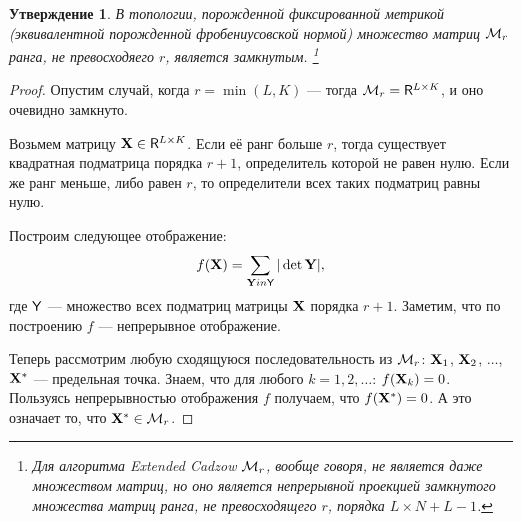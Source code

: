 \documentclass[12pt,a4paper,fleqn,leqno]{article}
\newtheorem{proposition}{Утверждение}%
\begin{document}
\begin{proposition}
В топологии, порожденной фиксированной метрикой (эквивалентной порожденной фробениусовской нормой) множество матриц $\mathcal{M}_r$ ранга, не превосходяего $r$, является замкнутым. \footnote{Для алгоритма Extended Cadzow $\mathcal{M}_r$, вообще говоря, не является даже множеством матриц, но оно является непрерывной проекцией замкнутого множества матриц ранга, не превосходящего $r$, порядка $L \times N + L - 1$.}
\end{proposition}
\begin{proof}
Опустим случай, когда $r = \min(L, K)$ --- тогда $\mathcal{M}_r = \mathsf{R}^{L \times K}$, и оно очевидно замкнуто.

Возьмем матрицу $\mathbf{X} \in \mathsf{R}^{L \times K}$. Если её ранг больше $r$, тогда существует квадратная подматрица порядка $r+1$, определитель которой не равен нулю. Если же ранг меньше, либо равен $r$, то определители всех таких подматриц равны нулю.

Построим следующее отображение: 
\begin{equation*}
f(\mathbf{X}) = \sum \limits_{\mathbf{Y} in \mathsf{Y}} |\det \mathbf{Y}|,
\end{equation*}
где $\mathsf{Y}$ --- множество всех подматриц матрицы $\mathbf{X}$ порядка $r + 1$. Заметим, что по построению $f$ --- непрерывное отображение.

Теперь рассмотрим любую сходящуюся последовательность из $\mathcal{M}_r$: $\mathbf{X}_1$, $\mathbf{X}_2$, $\ldots$, $\mathbf{X}^*$ --- предельная точка. Знаем, что для любого $k = 1, 2, \ldots$: $f(\mathbf{X}_k) = 0$. Пользуясь непрерывностью отображения $f$ получаем, что $f(\mathbf{X}^*) = 0$. А это означает то, что $\mathbf{X}^* \in \mathcal{M}_r$.
\end{proof}
\end{document}
